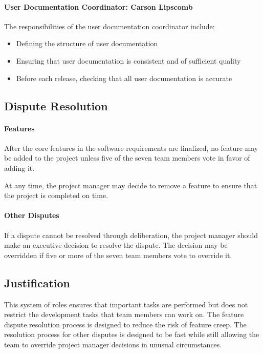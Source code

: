 \documentclass[10pt]{article}
\begin{document}
\paragraph{User Documentation Coordinator: Carson Lipscomb}

The responsibilities of the user documentation coordinator include:

\begin{itemize}
\item Defining the structure of user documentation
\item Ensuring that user documentation is consistent and of sufficient quality
\item Before each release, checking that all user documentation is accurate
\end{itemize}

\subsection{Dispute Resolution}

\paragraph{Features}

After the core features in the software requirements are finalized, no feature
may be added to the project unless five of the seven team members vote in favor
of adding it.

At any time, the project manager may decide to remove a feature to ensure that
the project is completed on time.

\paragraph{Other Disputes}

If a dispute cannot be resolved through deliberation, the project manager should
make an executive decision to resolve the dispute. The decision may be overridden
if five or more of the seven team members vote to override it.

\subsection{Justification}

This system of roles ensures that important tasks are performed but does not
restrict the development tasks that team members can work on. The feature dispute
resolution process is designed to reduce the risk of feature creep. The resolution
process for other disputes is designed to be fast while still allowing the team
to override project manager decisions in unusual circumstances.
\end{document}
